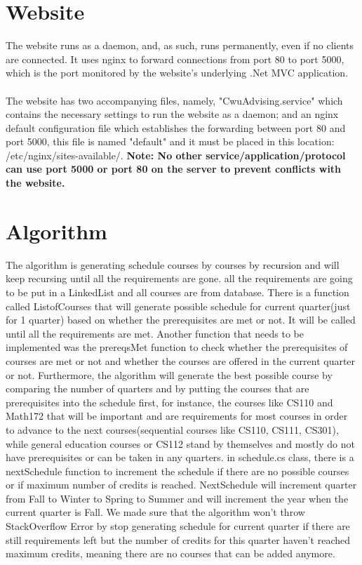 \documentclass[letterpaper]{report}
\begin{document}
	\chapter{Website}
	The website runs as a daemon, and, as such, runs permanently, even if no clients are connected. It uses nginx to forward connections from port 80 to port 5000, which is the port monitored by the website's underlying .Net MVC application.\\ \\ The website has two accompanying files, namely, "CwuAdvising.service" which contains the necessary settings to run the website as a daemon; and an nginx default configuration file which establishes the forwarding between port 80 and port 5000, this file is named "default" and it must be placed in this location: /etc/nginx/sites-available/. \textbf{Note: No other service/application/protocol can use port 5000 or port 80 on the server to prevent conflicts with the website.}
	\chapter{Algorithm}
	The algorithm is generating schedule courses by courses by recursion and will keep recursing until all the requirements are gone. all the requirements are going to be put in a LinkedList and all courses are from database.
	There is a function called ListofCourses that will generate possible schedule for current quarter(just for 1 quarter) based on whether the prerequisites are met or not. It will be called until all the requirements are met.
	Another function that needs to be implemented was the prereqsMet function to check whether the prerequisites of courses are met or not and whether the courses are offered in the current quarter or not.
	Furthermore, the algorithm will generate the best possible course by comparing the number of quarters and by putting the courses that are prerequisites into the schedule first, for instance, the courses like CS110 and Math172 that 
	will be important and are requirements for most courses in order to advance to the next courses(sequential courses like CS110, CS111, CS301), while general education courses or CS112 stand by themselves and mostly do not have prerequisites
	or can be taken in any quarters. in schedule.cs class, there is a nextSchedule function to increment the schedule if there are no possible courses or if maximum number of credits is reached. NextSchedule will increment quarter from Fall to Winter
	to Spring to Summer and will increment the year when the current quarter is Fall. We made sure that the algorithm won't throw StackOverflow Error by stop generating schedule for current quarter if
	there are still requirements left but the number of credits for this quarter haven't reached maximum credits, meaning there are no courses that can be added anymore.
\end{document}
